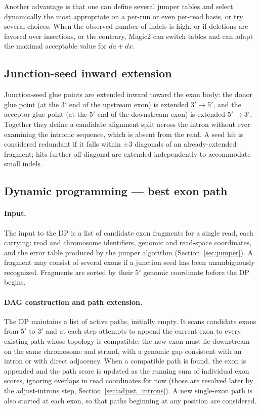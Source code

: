 \documentclass[11pt]{article}
\begin{document}
Another advantage is that one can define several jumper tables
and select dynamically the most appropriate on a per-run or even per-read basis,
or try several choices. When the observed number of indels is high,
or if deletions are favored over insertions, or the contrary, Magic2
can switch tables and can adapt the maximal acceptable value for $da+dx$.

\subsection{Junction-seed inward extension}
\label{sec:junction_inward}

Junction-seed glue points are extended inward toward the exon body:
the donor glue point (at the 3$'$ end of the upstream exon) is
extended 3$'{\to}$5$'$, and the acceptor glue point (at the 5$'$ end
of the downstream exon) is extended 5$'{\to}$3$'$.
Together they define a candidate alignment split across the intron
without ever examining the intronic sequence, which is absent from
the read.
A seed hit is considered redundant if it falls within $\pm 3$
diagonals of an already-extended fragment; hits further off-diagonal
are extended independently to accommodate small indels.

\subsection{Dynamic programming --- best exon path}
\label{sec:dp}

\paragraph{Input.}
The input to the DP is a list of candidate exon fragments for a
single read, each carrying: read and chromosome identifiers,
genomic and read-space coordinates, and the error table produced
by the jumper algorithm (Section~\ref{sec:jumper}).
A fragment may consist of several exons if a junction
seed has been unambiguously recognized.
Fragments are sorted by their 5$'$ genomic coordinate before the
DP begins.

\paragraph{DAG construction and path extension.}
The DP maintains a list of active paths, initially empty.
It scans candidate exons from 5$'$ to 3$'$ and at each step
attempts to append the current exon to every existing path whose
topology is compatible: the new exon must lie downstream on the
same chromosome and strand, with a genomic gap consistent with
an intron or with direct adjacency.
When a compatible path is found, the exon is appended and the
path score is updated as the running sum of individual exon
scores, ignoring overlaps in read coordinates for now
(those are resolved later by the adjust-introns step,
Section~\ref{sec:adjust_introns}).
A new single-exon path is also started at each exon, so that
paths beginning at any position are considered.
\end{document}
